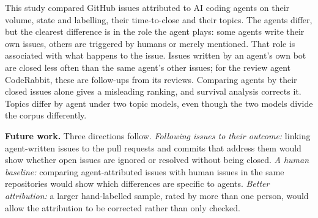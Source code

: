 This study compared \NIssues{} GitHub issues attributed to \NAgents{} AI coding agents on their volume, state and labelling, their time-to-close and their topics. The agents differ, but the clearest difference is in the role the agent plays: some agents write their own issues, others are triggered by humans or merely mentioned. That role is associated with what happens to the issue. Issues written by an agent's own bot are closed less often than the same agent's other issues; for the review agent CodeRabbit, these are follow-ups from its reviews. Comparing agents by their closed issues alone gives a misleading ranking, and survival analysis corrects it. Topics differ by agent under two topic models, even though the two models divide the corpus differently.

\textbf{Future work.} Three directions follow. \emph{Following issues to their outcome:} linking agent-written issues to the pull requests and commits that address them would show whether open issues are ignored or resolved without being closed. \emph{A human baseline:} comparing agent-attributed issues with human issues in the same repositories would show which differences are specific to agents. \emph{Better attribution:} a larger hand-labelled sample, rated by more than one person, would allow the attribution to be corrected rather than only checked.

